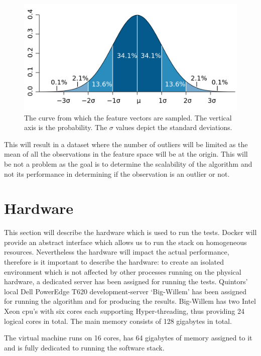 \begin{figure}[ht!]
\centering
\includegraphics[width=\textwidth]{figures/bellcurve.png}
\caption[Standard normal distribution]{The curve from which the feature vectors are sampled. The vertical axis is the probability. The $\sigma$ values depict the standard deviations. \label{gaussianDistribution}}
\end{figure}

This will result in a dataset where the number of outliers will be limited as the mean of all the observations in the feature space will be at the origin. This will be not a problem as the goal is to determine the scalability of the algorithm and not its performance in determining if the observation is an outlier or not.

\section{Hardware \label{sec:hardware}}
This section will describe the hardware which is used to run the tests. Docker will provide an abstract interface which allows us to run the stack on homogeneous resources. Nevertheless the hardware will impact the actual performance, therefore is it important to describe the hardware: to create an isolated environment which is not affected by other processes running on the physical hardware, a dedicated server has been assigned for running the tests. Quintors' local Dell PowerEdge T620 development-server `Big-Willem' has been assigned for running the algorithm and for producing the results. Big-Willem has two Intel Xeon cpu's with six cores each supporting Hyper-threading, thus providing 24 logical cores in total. The main memory consists of 128 gigabytes in total. 

The virtual machine runs on 16 cores, has 64 gigabytes of memory assigned to it and is fully dedicated to running the software stack.

